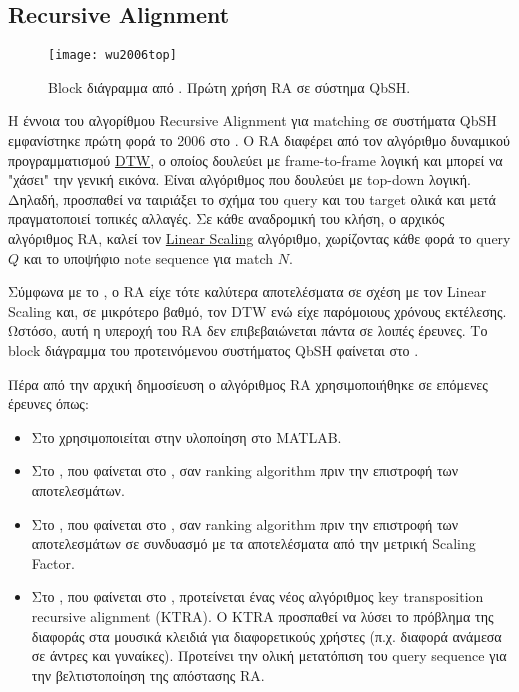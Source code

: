 \newcommand*{\ra}{Recursive Alignment}%
\subsection{\ra{}}
\begin{figure}
	\centering
	\texttt{[image: wu2006top]}
	\caption{Block διάγραμμα από \protect\cite{wu2006top}. Πρώτη χρήση RA σε σύστημα QbSH.}
	\label{fig:wu2006top}
\end{figure}
\forceendwrapfig{}
Η έννοια του αλγορίθμου \ra{} για matching σε συστήματα QbSH εμφανίστηκε πρώτη φορά το 2006 στο \cite{wu2006top}.
Ο RA διαφέρει από τον αλγόριθμο δυναμικού προγραμματισμού \hyperref[sub:DTW]{DTW},
ο οποίος δουλεύει με frame-to-frame λογική και μπορεί να "χάσει" την γενική εικόνα.
Είναι αλγόριθμος που δουλεύει με top-down λογική.
Δηλαδή, προσπαθεί να ταιριάξει το σχήμα του query και του target ολικά και μετά πραγματοποιεί τοπικές αλλαγές.
Σε κάθε αναδρομική του κλήση, ο αρχικός αλγόριθμος RA, καλεί τον \hyperref[sub:ls]{Linear Scaling} αλγόριθμο,
χωρίζοντας κάθε φορά το query $Q$ και το υποψήφιο note sequence για match $N$.

Σύμφωνα με το \cite{wu2006top},
ο RA είχε τότε καλύτερα αποτελέσματα σε σχέση με τον Linear Scaling και, σε μικρότερο βαθμό, τον DTW ενώ είχε παρόμοιους χρόνους εκτέλεσης.
Ωστόσο, αυτή η υπεροχή του RA δεν επιβεβαιώνεται πάντα σε λοιπές έρευνες.
Το block διάγραμμα του προτεινόμενου συστήματος QbSH φαίνεται στο .

Πέρα από την αρχική δημοσίευση ο αλγόριθμος RA χρησιμοποιήθηκε σε επόμενες έρευνες όπως:
\begin{itemize}
	\item Στο \cite{ryynanen2008query} χρησιμοποιείται στην υλοποίηση στο MATLAB.
	\item Στο \cite{wang2012query}, που φαίνεται στο , σαν ranking algorithm πριν την επιστροφή των αποτελεσμάτων.
	\item Στο \cite{guo2012query}, που φαίνεται στο , σαν ranking algorithm πριν την επιστροφή των αποτελεσμάτων σε συνδυασμό με τα αποτελέσματα από την μετρική Scaling Factor.
	\item Στο \cite{guo2013query}, που φαίνεται στο , προτείνεται ένας νέος αλγόριθμος key transposition recursive alignment (KTRA).
	      Ο KTRA προσπαθεί να λύσει το πρόβλημα της διαφοράς στα μουσικά κλειδιά για διαφορετικούς χρήστες (π.χ. διαφορά ανάμεσα σε άντρες και γυναίκες).
	      Προτείνει την ολική μετατόπιση του query sequence για την βελτιστοποίηση της απόστασης RA.
\end{itemize}

\undef{\ra}
